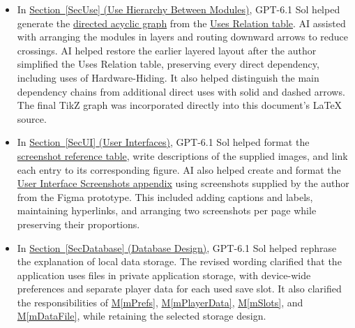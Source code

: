 \documentclass[10pt, titlepage]{article}
\newcommand{\mref}[1]{\texorpdfstring{\hyperref[md:#1]{M\ref*{#1}}}{M\ref*{#1}}}
\begin{document}
\begin{itemize}
    \item In \hyperref[SecUse]{Section~\ref*{SecUse}
    (Use Hierarchy Between Modules)}, GPT-6.1 Sol helped generate the
    \hyperref[FigUH]{directed acyclic graph} from the
    \hyperref[TblUses]{Uses Relation table}. AI assisted with arranging the
    modules in layers and routing downward arrows to reduce crossings.
    AI helped restore the earlier layered layout after the author simplified
    the Uses Relation table, preserving every direct dependency, including
    uses of Hardware-Hiding. It also helped distinguish the main dependency
    chains from additional direct uses with solid and dashed arrows. The final
    TikZ graph was incorporated directly into this document's \LaTeX{} source.

    \item In \hyperref[SecUI]{Section~\ref*{SecUI} (User Interfaces)},
    GPT-6.1 Sol helped format the
    \hyperref[TblUIScreens]{screenshot reference table}, write descriptions
    of the supplied images, and link each entry to its corresponding figure.
    AI also helped create and format the
    \hyperref[AppUIScreens]{User Interface Screenshots appendix} using
    screenshots supplied by the author from the Figma prototype. This
    included adding captions and labels, maintaining hyperlinks, and
    arranging two screenshots per page while preserving their proportions.

    \item In \hyperref[SecDatabase]{Section~\ref*{SecDatabase}
    (Database Design)}, GPT-6.1 Sol helped rephrase the explanation of local
    data storage. The revised wording clarified that the application uses
    files in private application storage, with device-wide preferences and
    separate player data for each used save slot. It also clarified the
    responsibilities of \mref{mPrefs}, \mref{mPlayerData}, \mref{mSlots}, and
    \mref{mDataFile}, while retaining the selected storage design.


\end{itemize}
\end{document}
